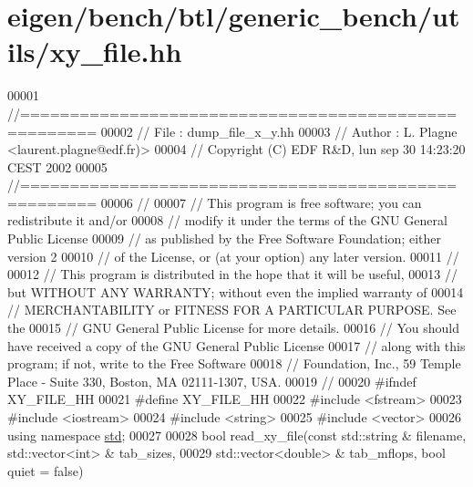 \hypertarget{eigen_2bench_2btl_2generic__bench_2utils_2xy__file_8hh_source}{}\section{eigen/bench/btl/generic\+\_\+bench/utils/xy\+\_\+file.hh}
\label{eigen_2bench_2btl_2generic__bench_2utils_2xy__file_8hh_source}

\begin{DoxyCode}
00001 \textcolor{comment}{//=====================================================}
00002 \textcolor{comment}{// File   :  dump\_file\_x\_y.hh}
00003 \textcolor{comment}{// Author :  L. Plagne <laurent.plagne@edf.fr)>        }
00004 \textcolor{comment}{// Copyright (C) EDF R&D,  lun sep 30 14:23:20 CEST 2002}
00005 \textcolor{comment}{//=====================================================}
00006 \textcolor{comment}{// }
00007 \textcolor{comment}{// This program is free software; you can redistribute it and/or}
00008 \textcolor{comment}{// modify it under the terms of the GNU General Public License}
00009 \textcolor{comment}{// as published by the Free Software Foundation; either version 2}
00010 \textcolor{comment}{// of the License, or (at your option) any later version.}
00011 \textcolor{comment}{// }
00012 \textcolor{comment}{// This program is distributed in the hope that it will be useful,}
00013 \textcolor{comment}{// but WITHOUT ANY WARRANTY; without even the implied warranty of}
00014 \textcolor{comment}{// MERCHANTABILITY or FITNESS FOR A PARTICULAR PURPOSE.  See the}
00015 \textcolor{comment}{// GNU General Public License for more details.}
00016 \textcolor{comment}{// You should have received a copy of the GNU General Public License}
00017 \textcolor{comment}{// along with this program; if not, write to the Free Software}
00018 \textcolor{comment}{// Foundation, Inc., 59 Temple Place - Suite 330, Boston, MA  02111-1307, USA.}
00019 \textcolor{comment}{// }
00020 \textcolor{preprocessor}{#ifndef XY\_FILE\_HH}
00021 \textcolor{preprocessor}{#define XY\_FILE\_HH}
00022 \textcolor{preprocessor}{#include <fstream>}
00023 \textcolor{preprocessor}{#include <iostream>}
00024 \textcolor{preprocessor}{#include <string>}
00025 \textcolor{preprocessor}{#include <vector>}
00026 \textcolor{keyword}{using namespace }\hyperlink{namespacestd}{std};
00027 
00028 \textcolor{keywordtype}{bool} read\_xy\_file(\textcolor{keyword}{const} std::string & filename, std::vector<int> & tab\_sizes,
00029                   std::vector<double> & tab\_mflops, \textcolor{keywordtype}{bool} quiet = \textcolor{keyword}{false})

\end{DoxyCode}
